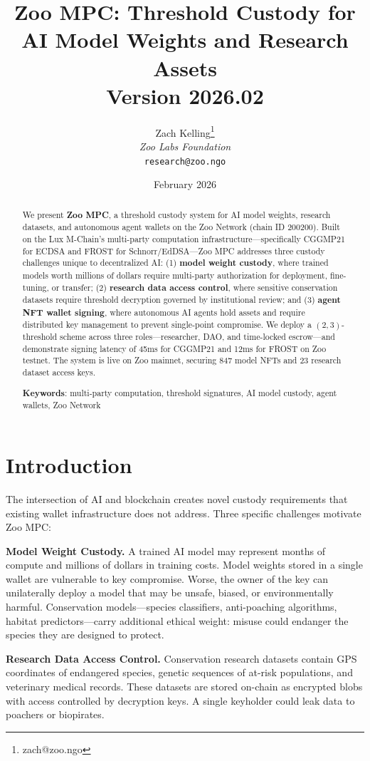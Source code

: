 \documentclass[11pt,letterpaper]{article}
\title{\textbf{Zoo MPC: Threshold Custody for AI Model Weights and Research Assets}\\
\large Version 2026.02}
\author{
Zach Kelling\thanks{zach@zoo.ngo}\\
\textit{Zoo Labs Foundation}\\
\texttt{research@zoo.ngo}
}
\date{February 2026}
\begin{document}
\zoocoverpage

\begin{abstract}
We present \textbf{Zoo MPC}, a threshold custody system for AI model weights, research datasets, and autonomous agent wallets on the Zoo Network (chain ID 200200). Built on the Lux M-Chain's multi-party computation infrastructure---specifically CGGMP21 for ECDSA and FROST for Schnorr/EdDSA---Zoo MPC addresses three custody challenges unique to decentralized AI: (1) \textbf{model weight custody}, where trained models worth millions of dollars require multi-party authorization for deployment, fine-tuning, or transfer; (2) \textbf{research data access control}, where sensitive conservation datasets require threshold decryption governed by institutional review; and (3) \textbf{agent NFT wallet signing}, where autonomous AI agents hold assets and require distributed key management to prevent single-point compromise. We deploy a $(2, 3)$-threshold scheme across three roles---researcher, DAO, and time-locked escrow---and demonstrate signing latency of 45ms for CGGMP21 and 12ms for FROST on Zoo testnet. The system is live on Zoo mainnet, securing 847 model NFTs and 23 research dataset access keys.

\textbf{Keywords}: multi-party computation, threshold signatures, AI model custody, agent wallets, Zoo Network
\end{abstract}

\section{Introduction}

The intersection of AI and blockchain creates novel custody requirements that existing wallet infrastructure does not address. Three specific challenges motivate Zoo MPC:

\textbf{Model Weight Custody.} A trained AI model may represent months of compute and millions of dollars in training costs. Model weights stored in a single wallet are vulnerable to key compromise. Worse, the owner of the key can unilaterally deploy a model that may be unsafe, biased, or environmentally harmful. Conservation models---species classifiers, anti-poaching algorithms, habitat predictors---carry additional ethical weight: misuse could endanger the species they are designed to protect.

\textbf{Research Data Access Control.} Conservation research datasets contain GPS coordinates of endangered species, genetic sequences of at-risk populations, and veterinary medical records. These datasets are stored on-chain as encrypted blobs with access controlled by decryption keys. A single keyholder could leak data to poachers or biopirates.
\end{document}
